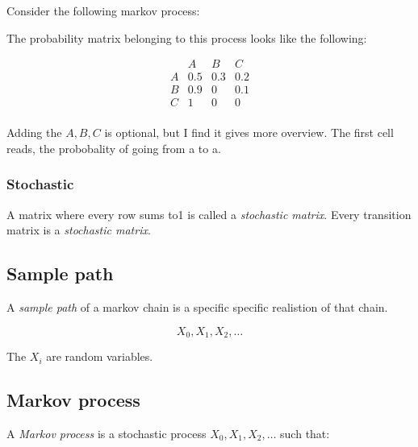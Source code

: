 \documentclass{article}
\begin{document}
Consider the following markov process:
\begin{center}

The probability matrix belonging to this process looks like the following:

\[
\begin{matrix}
		& A		& B		& C \\
	A	& 0.5	& 0.3	& 0.2 \\
	B	& 0.9	& 0		& 0.1 \\
	C	& 1		& 0		& 0 \\
\end{matrix}
\]

\end{center}

Adding the $A,B,C$ is optional, but I find it gives more overview. The first
cell reads, the probobality of going from a to a.

\subsubsection{Stochastic}
A matrix where every row sums to1 is called a \emph{stochastic matrix}. Every
transition matrix is a \emph{stochastic matrix}.

\subsection{Sample path}
A \emph{sample path} of a markov chain is a specific specific realistion of
that chain.

\[ X_0,X_1,X_2,\dots\]

The $X_i$ are random variables.

\subsection{Markov process}
A \emph{Markov process} is a stochastic process $X_0, X_1, X_2, \dots$ such 
that:
\end{document}
